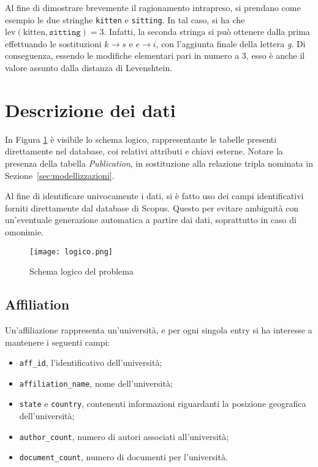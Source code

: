 Al fine di dimostrare brevemente il ragionamento intrapreso, si prendano come
esempio le due stringhe \texttt{kitten} e \texttt{sitting}. In tal caso, si
ha che $\text{lev}(\text{kitten}, \texttt{sitting}) = 3$. Infatti, la seconda
stringa si può ottenere dalla prima effettuando le sostituzioni $k \to s$
e $e \to i$, con l'aggiunta finale della lettera \textit{g}.
Di conseguenza, essendo le modifiche elementari pari in numero a 3, esso è
anche il valore assunto dalla distanza di Levenshtein.

\section{Descrizione dei dati}\label{sec:descrizionedati}

In Figura \ref{fig:logico} è visibile lo schema logico, rappresentante
le tabelle presenti direttamente nel database, coi relativi attributi e chiavi
esterne. Notare la presenza della tabella \textit{Publication}, in sostituzione
alla relazione tripla nominata in Sezione~\ref{sec:modellizzazioni}.

Al fine di identificare univocamente i dati, si è fatto uso dei campi
identificativi forniti direttamente dal database di Scopus. Questo per evitare
ambiguità con un'eventuale generazione automatica a partire dai dati,
soprattutto in caso di omonimie.

\begin{figure}
  \centering
  \texttt{[image: logico.png]}
  \caption{Schema logico del problema}
  \label{fig:logico}
\end{figure}

\subsection{Affiliation}

Un'affiliazione rappresenta un'università, e per ogni singola entry si ha
interesse a mantenere i seguenti campi:

\begin{itemize}
  \item \texttt{aff\_id}, l'identificativo dell'università;
  \item \texttt{affiliation\_name}, nome dell'università;
  \item \texttt{state} e \texttt{country}, contenenti informazioni riguardanti la posizione geografica dell'università;
  \item \texttt{author\_count}, numero di autori associati all'università;
  \item \texttt{document\_count}, numero di documenti per l'università.
\end{itemize}

